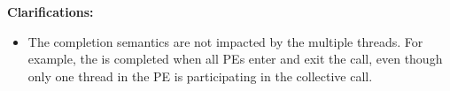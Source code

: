 {\bf Clarifications:}
 
\begin{itemize}
 

\item[]
The completion semantics are not impacted by the multiple threads. 
For example, the  is completed when all \acp{PE} enter and
exit the  call, even though only one thread in the \ac{PE} is
participating in the collective call. 

 
\end{itemize}
